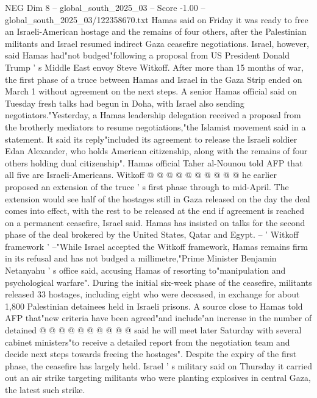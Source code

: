 \begin{textsample}{NEG Dim 8 – global\_south\_2025\_03 – Score -1.00 – global\_south\_2025\_03/122358670.txt}  \label{ex:f8_neg_307}
Hamas said on Friday it was ready to free an Israeli-American hostage and the remains of four others, after the Palestinian militants and Israel resumed indirect Gaza ceasefire negotiations.
Israel, however, said Hamas had"not budged"following a proposal from US President Donald Trump ' s Middle East envoy Steve Witkoff.
After more than 15 months of war, the first phase of a truce between Hamas and Israel in the Gaza Strip ended on March 1 without agreement on the next steps.
A senior Hamas official said on Tuesday fresh talks had begun in Doha, with Israel also sending negotiators."Yesterday, a Hamas leadership delegation received a proposal from the brotherly mediators to resume negotiations,"the Islamist movement said in a statement.
It said its reply"included its agreement to release the Israeli soldier Edan Alexander, who holds American citizenship, along with the remains of four others holding dual citizenship".
Hamas official Taher al-Nounou told AFP that all five are Israeli-Americans.
Witkoff @ @ @ @ @ @ @ @ @ @ he earlier proposed an extension of the truce ' s first phase through to mid-April.
The extension would see half of the hostages still in Gaza released on the day the deal comes into effect, with the rest to be released at the end if agreement is reached on a permanent ceasefire, Israel said.
Hamas has insisted on talks for the second phase of the deal brokered by the United States, Qatar and Egypt. -- ' Witkoff framework ' --"While Israel accepted the Witkoff framework, Hamas remains firm in its refusal and has not budged a millimetre,"Prime Minister Benjamin Netanyahu ' s office said, accusing Hamas of resorting to"manipulation and psychological warfare".
During the initial six-week phase of the ceasefire, militants released 33 hostages, including eight who were deceased, in exchange for about 1,800 Palestinian detainees held in Israeli prisons.
A source close to Hamas told AFP that"new criteria have been agreed"and include"an increase in the number of detained @ @ @ @ @ @ @ @ @ @ said he will meet later Saturday with several cabinet ministers"to receive a detailed report from the negotiation team and decide next steps towards freeing the hostages".
Despite the expiry of the first phase, the ceasefire has largely held.
Israel ' s military said on Thursday it carried out an air strike targeting militants who were planting explosives in central Gaza, the latest such strike.

\end{textsample}
